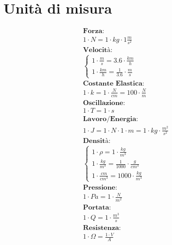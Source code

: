 \section{Unità di misura}

\begin{gather*}
  \textbf{Forza: } \\ 1 \cdot N = 1 \cdot kg \cdot 1 \frac{m}{s^2} \\
  \textbf{Velocità: } \\ \begin{cases}
    1 \cdot \frac{m}{s} = 3.6 \cdot \frac{km}{h} \\
1   \cdot \frac{km}{h} = \frac{1}{3.6} \cdot \frac{m}{s}
  \end{cases} \\
  \textbf{Costante Elastica: } \\ 1 \cdot k = 1 \cdot \frac{N}{cm} = 100 \cdot \frac{N}{m} \\
  \textbf{Oscillazione: } \\ 1 \cdot T = 1 \cdot s \\
  \textbf{Lavoro/Energia: } \\ 1 \cdot J = 1 \cdot N \cdot 1 \cdot m = 1 \cdot kg \cdot \frac{m^2}{s^2} \\
  \textbf{Densità: } \\ \begin{cases}
    1 \cdot \rho = 1 \cdot \frac{kg}{m^3} \\
    1 \cdot \frac{kg}{m^3} = \frac{1}{1000} \cdot \frac{g}{cm^3} \\
    1 \cdot \frac{cm}{cm^3} = 1000 \cdot \frac{kg}{m^3}
  \end{cases} \\
  \textbf{Pressione: } \\ 1 \cdot Pa = 1 \cdot \frac{N}{m^2} \\
  \textbf{Portata: } \\ 1 \cdot Q = 1 \cdot \frac{m^3}{s} \\
  \textbf{Resistenza: } \\ 1 \cdot \Omega = \frac{1 \cdot V}{A}
\end{gather*}